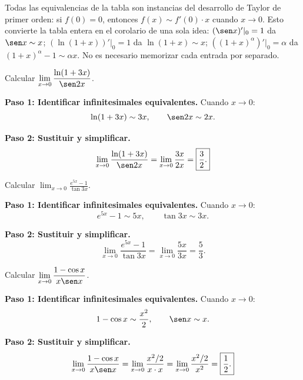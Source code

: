 \begin{rem}
Todas las equivalencias de la tabla son instancias del desarrollo de Taylor
de primer orden: si $f(0)=0$, entonces $f(x)\sim f'(0)\cdot x$ cuando
$x\to 0$. Esto convierte la tabla entera en el corolario de una sola idea:
$(\sen x)'|_0=1$ da $\sen x\sim x$; $(\ln(1+x))'|_0=1$ da
$\ln(1+x)\sim x$; $((1+x)^\alpha)'|_0=\alpha$ da
$(1+x)^\alpha-1\sim\alpha x$. No es necesario memorizar cada entrada por
separado.
\end{rem}

\begin{example}
Calcular $\displaystyle\lim_{x\to 0}\frac{\ln(1+3x)}{\sen 2x}$.

\begin{myproof}
\textbf{Paso 1: Identificar infinitesimales equivalentes.} Cuando $x\to 0$:
\[
  \ln(1+3x)\sim 3x, \qquad \sen 2x\sim 2x.
\]

\textbf{Paso 2: Sustituir y simplificar.}
\[
  \lim_{x\to 0}\frac{\ln(1+3x)}{\sen 2x}
  = \lim_{x\to 0}\frac{3x}{2x} = \boxed{\dfrac{3}{2}.}
\]
\end{myproof}
\end{example}

\begin{example}
Calcular $\displaystyle\lim_{x\to 0}\frac{e^{5x}-1}{\tan 3x}$.

\begin{myproof}
\textbf{Paso 1: Identificar infinitesimales equivalentes.} Cuando $x\to 0$:
\[
  e^{5x}-1\sim 5x, \qquad \tan 3x\sim 3x.
\]

\textbf{Paso 2: Sustituir y simplificar.}
\[
  \lim_{x\to 0}\frac{e^{5x}-1}{\tan 3x}
  = \lim_{x\to 0}\frac{5x}{3x} = \boxed{\dfrac{5}{3}.}
\]
\end{myproof}
\end{example}

\begin{example}
Calcular $\displaystyle\lim_{x\to 0}\frac{1-\cos x}{x\sen x}$.

\begin{myproof}
\textbf{Paso 1: Identificar infinitesimales equivalentes.} Cuando $x\to 0$:
\[
  1-\cos x\sim\frac{x^2}{2}, \qquad \sen x\sim x.
\]

\textbf{Paso 2: Sustituir y simplificar.}
\[
  \lim_{x\to 0}\frac{1-\cos x}{x\sen x}
  = \lim_{x\to 0}\frac{x^2/2}{x\cdot x}
  = \lim_{x\to 0}\frac{x^2/2}{x^2} = \boxed{\dfrac{1}{2}.}
\]
\end{myproof}
\end{example}


